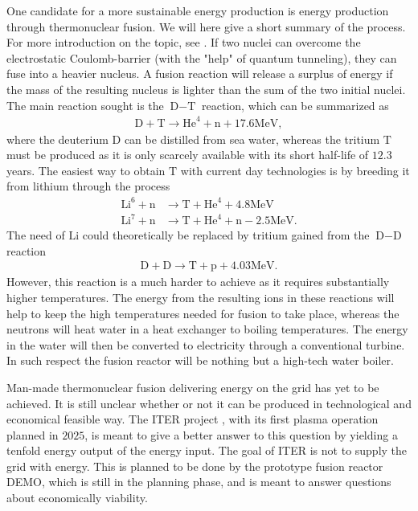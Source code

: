 One candidate for a more sustainable energy production is energy production through thermonuclear fusion.
We will here give a short summary of the process.
For more introduction on the topic, see \cite{Freidberg2008book}.
If two nuclei can overcome the electrostatic Coulomb-barrier (with the "help" of quantum tunneling), they can fuse into a heavier nucleus.
A fusion reaction will release a surplus of energy if the mass of the resulting nucleus is lighter than the sum of the two initial nuclei.
The main reaction sought is the $\text{D}-\text{T}$ reaction, which can be summarized as
%
\begin{align*}
    \text{D} + \text{T} \to \text{He}^4 + \text{n} + 17.6 \text{MeV},
\end{align*}
%
where the deuterium $\text{D}$ can be distilled from sea water, whereas the tritium $\text{T}$ must be produced as it is only scarcely available with its short half-life of $12.3$ years.
The easiest way to obtain $\text{T}$ with current day technologies is by breeding it from lithium through the process
%
\begin{align*}
    \text{Li}^6 + \text{n} &\to \text{T} + \text{He}^4 + 4.8 \text{MeV}\\
    \text{Li}^7 + \text{n} &\to \text{T} + \text{He}^4 + \text{n} - 2.5 \text{MeV}.
\end{align*}
%
The need of $\text{Li}$ could theoretically be replaced by tritium gained from the $\text{D}-\text{D}$ reaction
%
\begin{align*}
    \text{D} + \text{D} \to \text{T} + \text{p} + 4.03 \text{MeV}.
\end{align*}
%
However, this reaction is a much harder to achieve as it requires substantially higher temperatures.
The energy from the resulting ions in these reactions will help to keep the high temperatures needed for fusion to take place, whereas the neutrons will heat water in a heat exchanger to boiling temperatures.
The energy in the water will then be converted to electricity through a conventional turbine.
In such respect the fusion reactor will be nothing but a high-tech water boiler.

Man-made thermonuclear fusion delivering energy on the grid has yet to be achieved.
It is still unclear whether or not it can be produced in technological and economical feasible way.
The ITER project \cite{ITERWeb}, with its first plasma operation planned in $2025$, is meant to give a better answer to this question by yielding a tenfold energy output of the energy input.
The goal of ITER is not to supply the grid with energy.
This is planned to be done by the prototype fusion reactor DEMO, which is still in the planning phase, and is meant to answer questions about economically viability.

